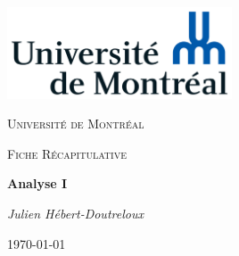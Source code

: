 \documentclass{article}[babel]
\begin{document}
	\begin{titlepage}
		\centering
		\includegraphics[width=0.5\textwidth]{Universite_de_Montreal_logo}\par\vspace{1cm}
		{\scshape\LARGE Université de Montréal\par}
		\vspace{1cm}
		{\scshape\Large Fiche Récapitulative\par}
		\vspace{1.5cm}
		{\huge\bfseries Analyse I\par}
		\vspace{2cm}
		{\Large\itshape Julien Hébert-Doutreloux\par}
		\vfill
		\vfill
		{\large \today\par}
	\end{titlepage}
		\setcounter{page}{2}
		\tableofcontents
		\newpage
		
		
		
		
		
		
		
		\newpage
		\onecolumn
		\printindex
\end{document}
